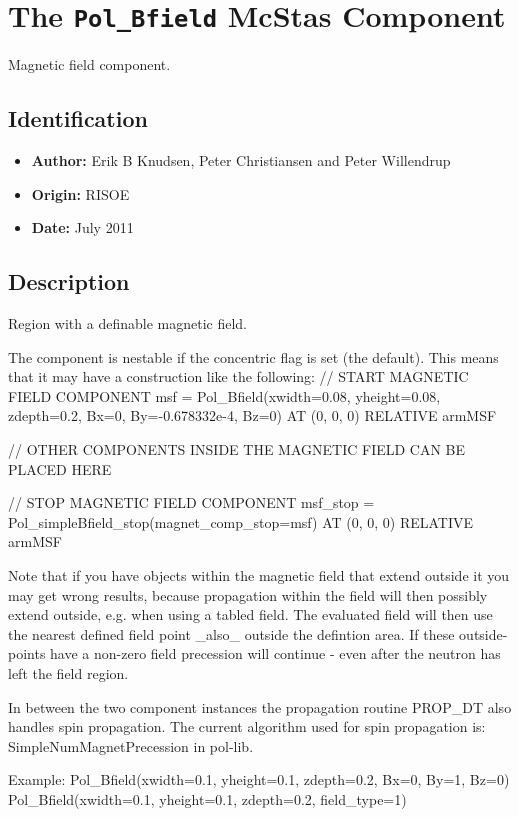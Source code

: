 \section{The \texttt{Pol\_Bfield} McStas Component}
Magnetic field component.

\subsection*{Identification}
\begin{itemize}
  \item \textbf{Author:} Erik B Knudsen, Peter Christiansen and Peter Willendrup
  \item \textbf{Origin:} RISOE
  \item \textbf{Date:} July 2011
\end{itemize}

\subsection*{Description}
Region with a definable magnetic field.

The component is nestable if the concentric flag is set (the default). This means that it may have a construction like the following: // START MAGNETIC FIELD COMPONENT msf = Pol\_Bfield(xwidth=0.08, yheight=0.08, zdepth=0.2, Bx=0, By=-0.678332e-4, Bz=0) AT (0, 0, 0) RELATIVE armMSF

// OTHER COMPONENTS INSIDE THE MAGNETIC FIELD CAN BE PLACED HERE

// STOP MAGNETIC FIELD COMPONENT msf\_stop = Pol\_simpleBfield\_stop(magnet\_comp\_stop=msf) AT (0, 0, 0) RELATIVE armMSF

Note that if you have objects within the magnetic field that extend outside it you may get wrong results, because propagation within the field will then possibly extend outside, e.g. when using a tabled field. The evaluated field will then use the nearest defined field point \_also\_ outside the defintion area. If these outside-points have a non-zero field precession will continue - even after the neutron has left the field region.

In between the two component instances the propagation routine PROP\_DT also handles spin propagation. The current algorithm used for spin propagation is: SimpleNumMagnetPrecession in pol-lib.

Example: Pol\_Bfield(xwidth=0.1, yheight=0.1, zdepth=0.2, Bx=0, By=1, Bz=0) Pol\_Bfield(xwidth=0.1, yheight=0.1, zdepth=0.2, field\_type=1)

